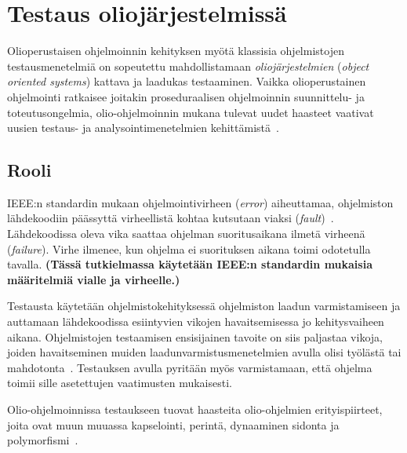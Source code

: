\documentclass[finnish, grading]{tktltiki2}
\theoremstyle{definition}
\theoremstyle{remark}
\begin{document}


\section{Testaus oliojärjestelmissä}

Olioperustaisen ohjelmoinnin kehityksen myötä klassisia ohjelmistojen testausmenetelmiä on sopeutettu mahdollistamaan \textit{oliojärjestelmien} (\textit{object oriented systems}) kattava ja laadukas testaaminen. Vaikka olioperustainen ohjelmointi ratkaisee joitakin proseduraalisen ohjelmoinnin suunnittelu- ja toteutusongelmia, olio-ohjelmoinnin mukana tulevat uudet haasteet vaativat uusien testaus- ja analysointimenetelmien kehittämistä~\cite[s. 86]{Mariani:Pezze:2008}. 

\subsection{Rooli}

IEEE:n standardin mukaan ohjelmointivirheen (\textit{error}) aiheuttamaa, ohjelmiston lähdekoodiin päässyttä virheellistä kohtaa kutsutaan viaksi (\textit{fault})~\cite[s. 5]{IEEE:2009}. Lähdekoodissa oleva vika saattaa ohjelman suoritusaikana ilmetä virheenä (\textit{failure}). Virhe ilmenee, kun ohjelma ei suorituksen aikana toimi odotetulla tavalla. \textbf{(Tässä tutkielmassa käytetään IEEE:n standardin mukaisia määritelmiä vialle ja virheelle.)}

Testausta käytetään ohjelmistokehityksessä ohjelmiston laadun varmistamiseen ja auttamaan lähdekoodissa esiintyvien vikojen havaitsemisessa jo kehitysvaiheen aikana. Ohjelmistojen testaamisen ensisijainen tavoite on siis paljastaa vikoja, joiden havaitseminen muiden laadunvarmistusmenetelmien avulla olisi työlästä tai mahdotonta~\cite[s. 59]{Binder:1999}. Testauksen avulla pyritään myös varmistamaan, että ohjelma toimii sille asetettujen vaatimusten mukaisesti. %

Olio-ohjelmoinnissa testaukseen tuovat haasteita olio-ohjelmien erityispiirteet, joita ovat muun muuassa kapselointi, perintä, dynaaminen sidonta ja polymorfismi~\cite[s. 86]{Mariani:Pezze:2008}. 
\end{document}
